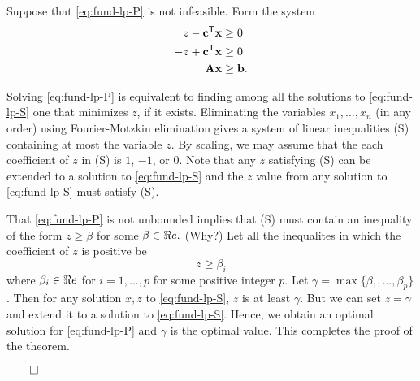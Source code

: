 Suppose that \eqref{eq:fund-lp-P} is not infeasible. Form the system
\begin{align}
\begin{split}
z- \mathbf{c}^{\mathsf{T}} \mathbf{x} & \geq 0\\
-z+ \mathbf{c}^{\mathsf{T}} \mathbf{x} & \geq 0 \\
\mathbf{A}\mathbf{x} & \geq \mathbf{b}.
\end{split}
\label{eq:fund-lp-S}
\end{align}

Solving \eqref{eq:fund-lp-P} is equivalent to finding among all the
solutions to \eqref{eq:fund-lp-S} one that minimizes \(z\), if it exists.
Eliminating the variables \(x_1,\ldots,x_n\) (in any order) using
Fourier-Motzkin elimination gives a system of linear inequalities (S)
containing at most the variable \(z\). By scaling, we may assume that
the each coefficient of \(z\) in (S) is \(1\), \(-1\), or \(0\). Note
that any \(z\) satisfying (S) can be extended to a solution to
\eqref{eq:fund-lp-S} and the \(z\) value from any solution to
\eqref{eq:fund-lp-S} must satisfy (S).

That \eqref{eq:fund-lp-P} is not unbounded implies that (S) must contain
an inequality of the form \(z \geq \beta\) for some \(\beta \in \Re e.\)
(Why?) Let all the inequalites in which the coefficient of \(z\) is
positive be \[z \geq \beta_i\] where \(\beta_i \in \Re e\) for
\(i = 1,\ldots,p\) for some positive integer \(p\). Let
\(\gamma = \max\{\beta_1,\ldots,\beta_p\}\). Then for any solution
\(x,z\) to \eqref{eq:fund-lp-S}, \(z\) is at least \(\gamma\). But we can
set \(z = \gamma\) and extend it to a solution to \eqref{eq:fund-lp-S}.
Hence, we obtain an optimal solution for \eqref{eq:fund-lp-P} and
\(\gamma\) is the optimal value. This completes the proof of the
theorem.

\(\qed\)

